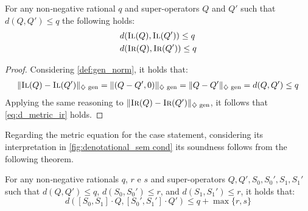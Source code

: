 \begin{theorem} \label{theorem_il_ir_metric}
  For any  non‑negative rational $q$ and super-operators $Q$ and $Q'$ such that $d(Q,Q') \leq q$ the following holds:
  \begin{align}
    & d(\textsc{Il}(Q),\textsc{Il} (Q')) \leq q \label {eq:d_metric_il}\\
    &d(\textsc{Ir}(Q),\textsc{Ir} (Q')) \leq q  \label {eq:d_metric_ir}
  \end{align}
\end{theorem}
 
\begin{proof}
  Considering \autoref{def:gen_norm}, it holds that:
  \begin{equation}
    \begin{split}
       \lVert \textsc{Il}(Q) - \textsc{Il}(Q') \rVert_{\diamondsuit \text{ gen}}= \lVert (Q - Q', 0) \rVert_{\diamondsuit \text{ gen}} = \lVert Q - Q' \rVert_{\diamondsuit \text{ gen}} = d(Q,Q') \leq q   \\
    \end{split}
  \end{equation}
  Applying the same reasoning to $\lVert \textsc{Ir}(Q) - \textsc{Ir}(Q') \rVert_{\diamondsuit \text{ gen}}$, it follows that \autoref{eq:d_metric_ir} holds.
\end{proof}

Regarding the metric equation for the case statement, considering its interpretation in \autoref{fig:denotational_sem cond} its soundness follows from the following theorem.

\begin{theorem} \label{theorem_case_metric}
  For any non‑negative rationals $q$, $r$ e $s$ and super-operators $Q, Q', S_0, S_0', S_1, S_1'$ such that $d(Q,Q') \leq q$, $d(S_0,S_0') \leq r$, and  $d(S_1,S_1') \leq r$, it holds that:
  \begin{equation}
    d( [S_0,S_1] \cdot Q, [S_0',S_1'] \cdot Q') \leq q + \max\{r,s\}
  \end{equation}
\end{theorem}

